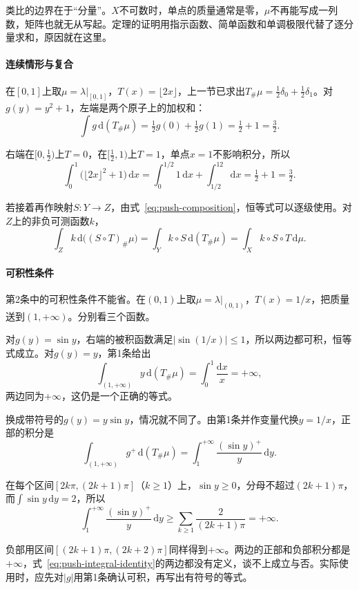 类比的边界在于“分量”。$X$不可数时，单点的质量通常是零，$\mu$不再能写成一列数，矩阵也就无从写起。定理的证明用指示函数、简单函数和单调极限代替了逐分量求和，原因就在这里。

\paragraph{连续情形与复合}
在$[0,1]$上取$\mu=\lambda|_{[0,1]}$，$T(x)=\lfloor2x\rfloor$，上一节已求出$T_\#\mu=\tfrac12\delta_0+\tfrac12\delta_1$。对$g(y)=y^2+1$，左端是两个原子上的加权和：
\[
\int g\,\mathrm d(T_\#\mu)=\tfrac12g(0)+\tfrac12g(1)=\tfrac12+1=\tfrac32 .
\]

右端在$[0,\tfrac12)$上$T=0$，在$[\tfrac12,1)$上$T=1$，单点$x=1$不影响积分，所以
\[
\int_0^1\bigl(\lfloor2x\rfloor^2+1\bigr)\,\mathrm dx=\int_0^{1/2}1\,\mathrm dx+\int_{1/2}^12\,\mathrm dx=\tfrac12+1=\tfrac32 .
\]

若接着再作映射$S:Y\to Z$，由式~\eqref{eq:push-composition}，恒等式可以逐级使用。对$Z$上的非负可测函数$k$，
\[
\int_Zk\,\mathrm d\bigl((S\circ T)_\#\mu\bigr)=\int_Yk\circ S\,\mathrm d(T_\#\mu)=\int_Xk\circ S\circ T\,\mathrm d\mu .
\]

\paragraph{可积性条件}
第2条中的可积性条件不能省。在$(0,1)$上取$\mu=\lambda|_{(0,1)}$，$T(x)=1/x$，把质量送到$(1,+\infty)$。分别看三个函数。

对$g(y)=\sin y$，右端的被积函数满足$\lvert\sin(1/x)\rvert\leq1$，所以两边都可积，恒等式成立。对$g(y)=y$，第1条给出
\[
\int_{(1,+\infty)}y\,\mathrm d(T_\#\mu)=\int_0^1\frac{\mathrm dx}{x}=+\infty ,
\]
两边同为$+\infty$，这仍是一个正确的等式。

换成带符号的$g(y)=y\sin y$，情况就不同了。由第1条并作变量代换$y=1/x$，正部的积分是
\[
\int_{(1,+\infty)}g^+\,\mathrm d(T_\#\mu)=\int_1^{+\infty}\frac{(\sin y)^+}{y}\,\mathrm dy .
\]

在每个区间$[2k\pi,(2k+1)\pi]$（$k\geq1$）上，$\sin y\geq0$，分母不超过$(2k+1)\pi$，而$\int\sin y\,\mathrm dy=2$，所以
\[
\int_1^{+\infty}\frac{(\sin y)^+}{y}\,\mathrm dy\geq\sum_{k\geq1}\frac{2}{(2k+1)\pi}=+\infty .
\]

负部用区间$[(2k+1)\pi,(2k+2)\pi]$同样得到$+\infty$。两边的正部和负部积分都是$+\infty$，式~\eqref{eq:push-integral-identity}的两边都没有定义，谈不上成立与否。实际使用时，应先对$\lvert g\rvert$用第1条确认可积，再写出有符号的等式。
